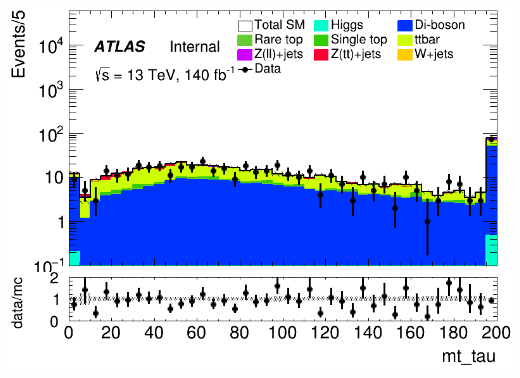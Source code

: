 \documentclass[usenames,dvipsnames]{beamer}
\begin{document}
\begin{frame}
\begin{minipage}{0.32\textwidth}
        \includegraphics[width=\textwidth]{graphics/LLH_met/LLH_met_mt_tau.png}
    \end{minipage}
    
    \vspace{0.5cm} %


\end{frame}
\end{document}
